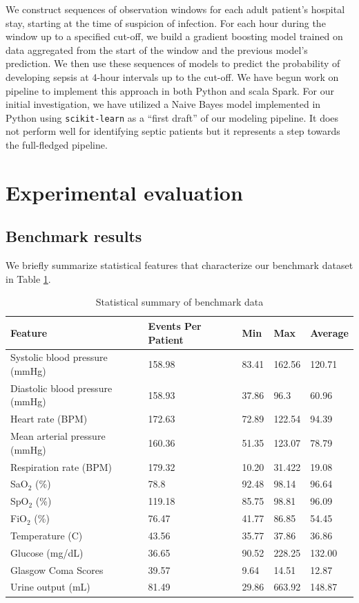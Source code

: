 \documentclass{amia}
\begin{document}
We construct sequences of observation windows for each adult patient's hospital stay, starting at the time
of suspicion of infection.  For each hour during the window up to a specified cut-off, we build a gradient boosting model
trained on data aggregated from the start of the window and the previous model's prediction.  
We then use these sequences of models to predict the probability of developing sepsis at 4-hour intervals up to the cut-off.
We have begun work on pipeline to implement this approach in both Python and scala Spark.  For our initial investigation, we 
have utilized a Naive Bayes model implemented in Python using \texttt{scikit-learn} as a ``first draft'' of our
modeling pipeline.  It does not perform well for identifying septic patients but it represents a step towards the 
full-fledged pipeline.
\section{Experimental evaluation}
\subsection*{Benchmark results}
We briefly summarize statistical features that characterize our benchmark dataset in Table \ref{tab:benchmark}.

\begin{table}[H]
\centering
\begin{tabular}{lllll}
\toprule
Feature & Events Per Patient & Min & Max & Average \\
\midrule
Systolic blood pressure (mmHg) & 158.98 & 83.41 & 162.56 & 120.71\\
Diastolic blood pressure (mmHg) & 158.93 & 37.86 & 96.3 & 60.96\\
Heart rate (BPM) & 172.63 & 72.89 & 122.54 & 94.39\\
Mean arterial pressure (mmHg) & 160.36 & 51.35 & 123.07 & 78.79\\
Respiration rate (BPM) & 179.32 & 10.20 & 31.422 & 19.08\\
SaO$_2$ (\%)  & 78.8 & 92.48 & 98.14 & 96.64\\
SpO$_2$ (\%) &  119.18 & 85.75 & 98.81 & 96.09\\
FiO$_2$ (\%) & 76.47 & 41.77 & 86.85 & 54.45\\
Temperature (C) & 43.56 & 35.77 & 37.86 & 36.86\\
Glucose (mg/dL) & 36.65 & 90.52 & 228.25 & 132.00\\
Glasgow Coma Scores & 39.57 & 9.64 & 14.51 & 12.87\\
Urine output (mL) & 81.49 & 29.86 & 663.92 & 148.87\\
\bottomrule
\end{tabular}
\caption{Statistical summary of benchmark data}\label{tab:benchmark}
\end{table}
\end{document}
